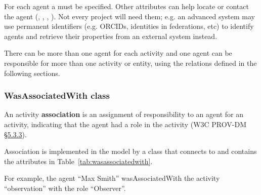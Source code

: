 
For each agent a  must be specified. 
Other attributes can help locate or contact the agent (, , , ). 
Not every project will need them; e.g. an advanced system may use permanent identifiers (e.g. ORCIDs, identities in federations, etc) to identify agents and retrieve their properties from an external system instead.

There can be more than one agent for each activity and one agent can be responsible for more than one activity or entity, using the relations defined in the following sections.


\subsubsection{WasAssociatedWith class}

An activity \textbf{association} is an assignment of responsibility to an agent for an activity, indicating that the agent had a role in the activity (W3C PROV-DM \href{https://www.w3.org/TR/prov-dm/#term-Association}{\S5.3.3}).

Association is implemented in the model by a class  that connects  to  and contains the attributes in Table~\ref{tab:wasassociatedwith}.

For example, the agent ``Max Smith'' wasAssociatedWith the activity ``observation'' with the role ``Observer''.

